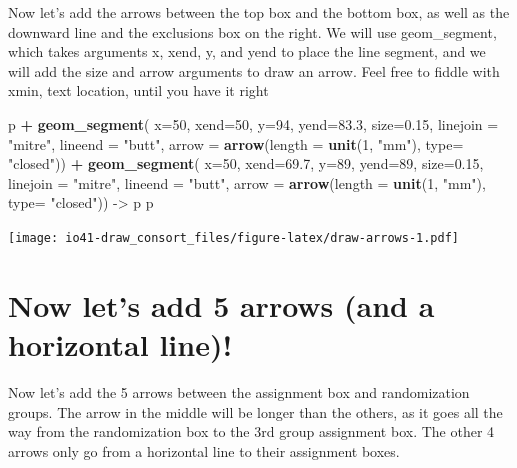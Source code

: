 \documentclass[
]{book}
\newenvironment{Shaded}{\begin{snugshade}}{\end{snugshade}}
\newcommand{\DataTypeTok}[1]{\textcolor[rgb]{0.13,0.29,0.53}{#1}}
\newcommand{\DecValTok}[1]{\textcolor[rgb]{0.00,0.00,0.81}{#1}}
\newcommand{\FloatTok}[1]{\textcolor[rgb]{0.00,0.00,0.81}{#1}}
\newcommand{\KeywordTok}[1]{\textcolor[rgb]{0.13,0.29,0.53}{\textbf{#1}}}
\newcommand{\NormalTok}[1]{#1}
\newcommand{\OperatorTok}[1]{\textcolor[rgb]{0.81,0.36,0.00}{\textbf{#1}}}
\newcommand{\StringTok}[1]{\textcolor[rgb]{0.31,0.60,0.02}{#1}}
\begin{document}
Now let's add the arrows between the top box and the bottom box, as well as the downward line and the exclusions box on the right.
We will use geom\_segment, which takes arguments x, xend, y, and yend to place the line segment, and we will add the size and arrow arguments to draw an arrow.
Feel free to fiddle with xmin, text location, until you have it right

\begin{Shaded}
\begin{Highlighting}[]
\NormalTok{p }\OperatorTok{+}
\StringTok{  }\KeywordTok{geom_segment}\NormalTok{(}
    \DataTypeTok{x=}\DecValTok{50}\NormalTok{, }\DataTypeTok{xend=}\DecValTok{50}\NormalTok{, }\DataTypeTok{y=}\DecValTok{94}\NormalTok{, }\DataTypeTok{yend=}\FloatTok{83.3}\NormalTok{, }
    \DataTypeTok{size=}\FloatTok{0.15}\NormalTok{, }\DataTypeTok{linejoin =} \StringTok{"mitre"}\NormalTok{, }\DataTypeTok{lineend =} \StringTok{"butt"}\NormalTok{,}
    \DataTypeTok{arrow =} \KeywordTok{arrow}\NormalTok{(}\DataTypeTok{length =} \KeywordTok{unit}\NormalTok{(}\DecValTok{1}\NormalTok{, }\StringTok{"mm"}\NormalTok{), }\DataTypeTok{type=} \StringTok{"closed"}\NormalTok{)) }\OperatorTok{+}
\StringTok{    }\KeywordTok{geom_segment}\NormalTok{(}
    \DataTypeTok{x=}\DecValTok{50}\NormalTok{, }\DataTypeTok{xend=}\FloatTok{69.7}\NormalTok{, }\DataTypeTok{y=}\DecValTok{89}\NormalTok{, }\DataTypeTok{yend=}\DecValTok{89}\NormalTok{, }
    \DataTypeTok{size=}\FloatTok{0.15}\NormalTok{, }\DataTypeTok{linejoin =} \StringTok{"mitre"}\NormalTok{, }\DataTypeTok{lineend =} \StringTok{"butt"}\NormalTok{,}
    \DataTypeTok{arrow =} \KeywordTok{arrow}\NormalTok{(}\DataTypeTok{length =} \KeywordTok{unit}\NormalTok{(}\DecValTok{1}\NormalTok{, }\StringTok{"mm"}\NormalTok{), }\DataTypeTok{type=} \StringTok{"closed"}\NormalTok{)) ->}
\StringTok{  }\NormalTok{p}
\NormalTok{p}
\end{Highlighting}
\end{Shaded}

\texttt{[image: io41-draw\_consort\_files/figure-latex/draw-arrows-1.pdf]}

\hypertarget{now-lets-add-5-arrows-and-a-horizontal-line}{%
\section{Now let's add 5 arrows (and a horizontal line)!}\label{now-lets-add-5-arrows-and-a-horizontal-line}}

Now let's add the 5 arrows between the assignment box and randomization groups. The arrow in the middle will be longer than the others, as it goes all the way from the randomization box to the 3rd group assignment box. The other 4 arrows only go from a horizontal line to their assignment boxes.
\end{document}
